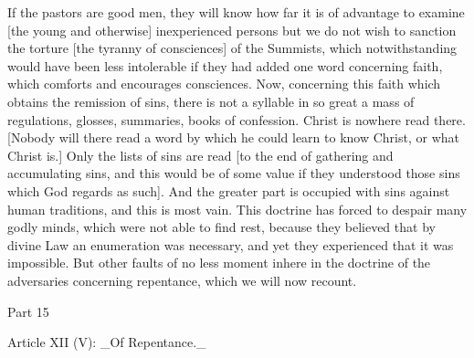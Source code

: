 If the pastors are good men, they will know how far it is of
advantage to examine [the young and otherwise] inexperienced persons
but we do not wish to sanction the torture [the tyranny of
consciences] of the Summists, which notwithstanding would have been
less intolerable if they had added one word concerning faith, which
comforts and encourages consciences.  Now, concerning this faith
which obtains the remission of sins, there is not a syllable in so
great a mass of regulations, glosses, summaries, books of confession.
Christ is nowhere read there.  [Nobody will there read a word by
which he could learn to know Christ, or what Christ is.] Only the
lists of sins are read [to the end of gathering and accumulating sins,
and this would be of some value if they understood those sins which
God regards as such].  And the greater part is occupied with sins
against human traditions, and this is most vain.  This doctrine has
forced to despair many godly minds, which were not able to find rest,
because they believed that by divine Law an enumeration was necessary,
and yet they experienced that it was impossible.  But other faults
of no less moment inhere in the doctrine of the adversaries
concerning repentance, which we will now recount.




Part 15


Article XII (V): _Of Repentance._

